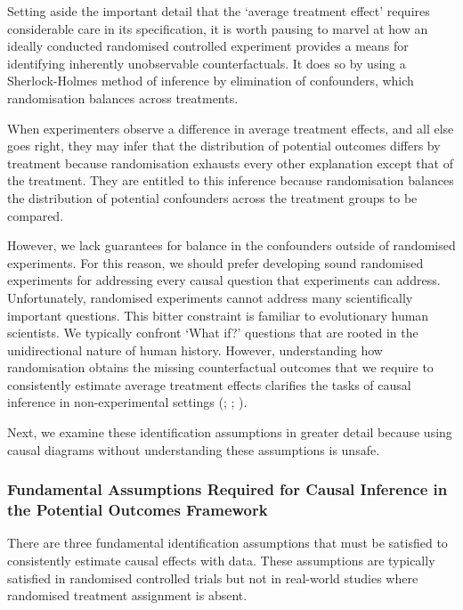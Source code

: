 \documentclass[
  single column]{article}
\begin{document}
Setting aside the important detail that the `average treatment effect'
requires considerable care in its specification, it is worth pausing to
marvel at how an ideally conducted randomised controlled experiment
provides a means for identifying inherently unobservable
counterfactuals. It does so by using a Sherlock-Holmes method of
inference by elimination of confounders, which randomisation balances
across treatments.

When experimenters observe a difference in average treatment effects,
and all else goes right, they may infer that the distribution of
potential outcomes differs by treatment because randomisation exhausts
every other explanation except that of the treatment. They are entitled
to this inference because randomisation balances the distribution of
potential confounders across the treatment groups to be compared.

However, we lack guarantees for balance in the confounders outside of
randomised experiments. For this reason, we should prefer developing
sound randomised experiments for addressing every causal question that
experiments can address. Unfortunately, randomised experiments cannot
address many scientifically important questions. This bitter constraint
is familiar to evolutionary human scientists. We typically confront
`What if?' questions that are rooted in the unidirectional nature of
human history. However, understanding how randomisation obtains the
missing counterfactual outcomes that we require to consistently estimate
average treatment effects clarifies the tasks of causal inference in
non-experimental settings (; ;
).

Next, we examine these identification assumptions in greater detail
because using causal diagrams without understanding these assumptions is
unsafe.

\subsubsection{Fundamental Assumptions Required for Causal Inference in
the Potential Outcomes
Framework}\label{fundamental-assumptions-required-for-causal-inference-in-the-potential-outcomes-framework}

There are three fundamental identification assumptions that must be
satisfied to consistently estimate causal effects with data. These
assumptions are typically satisfied in randomised controlled trials but
not in real-world studies where randomised treatment assignment is
absent.
\end{document}
